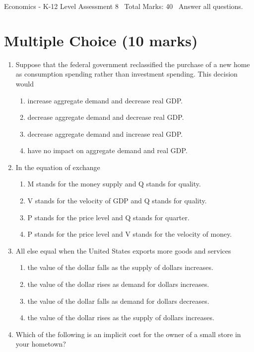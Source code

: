 \documentclass[12pt]{article}
\begin{document}
\begin{center}
Economics - K-12 Level Assessment 8 \
Total Marks: 40 \
Answer all questions.
\end{center}

\section*{Multiple Choice (10 marks)}
\begin{enumerate}[label=\arabic*.]
\item Suppose that the federal government reclassified the purchase of a new home as consumption spending rather than investment spending. This decision would
\begin{enumerate}[label=(\alph*)]
    \item increase aggregate demand and decrease real GDP.
    \item decrease aggregate demand and decrease real GDP.
    \item decrease aggregate demand and increase real GDP.
    \item have no impact on aggregate demand and real GDP.
\end{enumerate}
\item In the equation of exchange
\begin{enumerate}[label=(\alph*)]
    \item M stands for the money supply and Q stands for quality.
    \item V stands for the velocity of GDP and Q stands for quality.
    \item P stands for the price level and Q stands for quarter.
    \item P stands for the price level and V stands for the velocity of money.
\end{enumerate}
\item All else equal when the United States exports more goods and services
\begin{enumerate}[label=(\alph*)]
    \item the value of the dollar falls as the supply of dollars increases.
    \item the value of the dollar rises as demand for dollars increases.
    \item the value of the dollar falls as demand for dollars decreases.
    \item the value of the dollar rises as the supply of dollars increases.
\end{enumerate}
\item Which of the following is an implicit cost for the owner of a small store in your hometown?

\end{enumerate}
\end{document}
